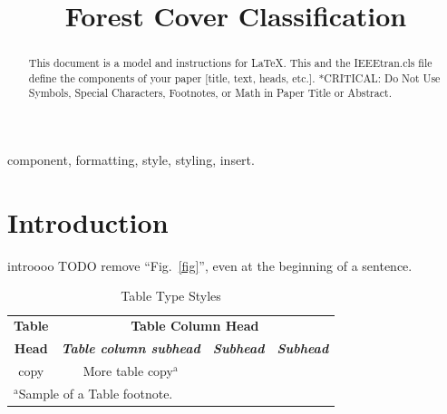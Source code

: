 \documentclass[conference]{IEEEtran}
\begin{document}
\title{Forest Cover Classification\\

}

\author{
}

\maketitle

\begin{abstract}
This document is a model and instructions for \LaTeX.
This and the IEEEtran.cls file define the components of your paper [title, text, heads, etc.]. *CRITICAL: Do Not Use Symbols, Special Characters, Footnotes, 
or Math in Paper Title or Abstract.
\end{abstract}

\begin{IEEEkeywords}
component, formatting, style, styling, insert.
\end{IEEEkeywords}

\section{Introduction}
introooo TODO remove
``Fig.~\ref{fig}'', even at the beginning of a sentence.

\begin{table}[htbp]
\caption{Table Type Styles}
\begin{center}
\begin{tabular}{|c|c|c|c|}
\hline
\textbf{Table}&\multicolumn{3}{|c|}{\textbf{Table Column Head}} \\
\cline{2-4} 
\textbf{Head} & \textbf{\textit{Table column subhead}}& \textbf{\textit{Subhead}}& \textbf{\textit{Subhead}} \\
\hline
copy& More table copy$^{\mathrm{a}}$& &  \\
\hline
\multicolumn{4}{l}{$^{\mathrm{a}}$Sample of a Table footnote.}
\end{tabular}
\label{tab1}
\end{center}
\end{table}
\end{document}
